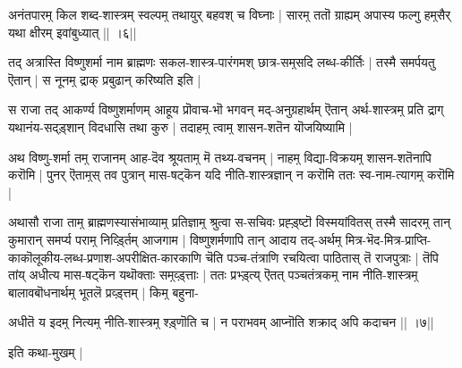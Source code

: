 \documentclass{article}
\begin{document}
अनंतपारम्̣ किल शब्द-शास्त्रम्
स्वल्पम्̣ तथायुर् बहवश् च विघ्नाः |
सारम्̣ ततॊ ग्राह्यम् अपास्य फल्गु
हम्̣सैर् यथा क्षीरम् इवांबुध्यात् || ।६||

तद् अत्रास्ति विष्णुशर्मा नाम ब्राह्मणः सकल-शास्त्र-पारंगमश् छात्र-सम्̣सदि लब्ध-कीर्तिः | तस्मै समर्पयतु ऎतान् | स नूनम्̣ द्राक् प्रबुढान् करिष्यति इति |

स राजा तद् आकर्ण्य विष्णुशर्माणम् आहूय प्रॊवाच-भॊ भगवन् मद्-अनुग्रहार्थम् ऎतान् अर्थ-शास्त्रम्̣ प्रति द्राग् यथानंय-सद्ड़्शान् विदधासि तथा कुरु | तदाहम्̣ त्वाम्̣ शासन-शतॆन यॊजयिष्यामि |

अथ विष्णु-शर्मा तम्̣ राजानम् आह-दॆव श्रूयताम्̣ मॆ तथ्य-वचनम् | नाहम्̣ विद्या-विक्रयम्̣ शासन-शतॆनापि करॊमि | पुनर् ऎताम्̣स् तव पुत्रान् मास-षट्कॆन यदि नीति-शास्त्रज्ञान् न करॊमि ततः स्व-नाम-त्यागम्̣ करॊमि |

अथासौ राजा ताम्̣ ब्राह्मणस्यासंभाव्याम्̣ प्रतिज्ञाम्̣ श्रुत्वा स-सचिवः प्रह्ड़्ष्टॊ विस्मयांवितस् तस्मै सादरम्̣ तान् कुमारान् समर्प्य पराम्̣ निर्व्ड़्तिम् आजगाम | विष्णुशर्मणापि तान् आदाय तद्-अर्थम्̣ मित्र-भॆद-मित्र-प्राप्ति-काकॊलूकीय-लब्ध-प्रणाश-अपरीक्षित-कारकाणि चॆति पञ्च-तंत्राणि रचयित्वा पाठितास् तॆ राजपुत्राः | तॆपि तांय् अधीत्य मास-षट्कॆन यथॊक्ताः सम्̣व्ड़्त्ताः | ततः प्रभ्ड़्त्य् ऎतत् पञ्चतंत्रकम्̣ नाम नीति-शास्त्रम्̣ बालावबॊधनार्थम्̣ भूतलॆ प्रव्ड़्त्तम् | किम्̣ बहुना-

अधीतॆ य इदम्̣ नित्यम्̣ नीति-शास्त्रम्̣ श्ड़्णॊति च |
न पराभवम् आप्नॊति शक्राद् अपि कदाचन || ।७||

इति कथा-मुखम् |
\end{document}
